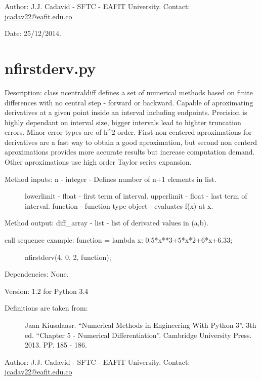 \documentclass[letterpaper,10pt,oneside]{sphinxmanual}
\theoremstyle{plain}%
\theoremstyle{definition}%
\theoremstyle{remark}%
\begin{document}
Author: J.J. Cadavid - SFTC - EAFIT University.
Contact: \href{mailto:jcadav22@eafit.edu.co}{jcadav22@eafit.edu.co}

Date: 25/12/2014.


\section{nfirstderv.py}
\label{code:module-nfirstderv}\label{code:nfirstderv-py}
Description: class ncentraldiff defines a set of numerical methods based on
finite differences with no central step - forward or backward. Capable of
aproximating derivatives at a given point inside an interval including 
endpoints. Precision is highly dependant on interval size, bigger intervals
lead to highter truncation errors. Minor error types are of h\textasciicircum{}2 order. First
non centered aproximations for derivatives are a fast way to obtain a good
aproximation, but second non centerd aproximations provides more accurate
results but increase computation demand. Other aproximations use high order
Taylor series expansion.
\begin{description}
\item[{Method inputs: n - integer - Defines number of n+1 elements in list.}] \leavevmode
lowerlimit - float - first term of interval.
upperlimit - float - last term of interval.
function - function type object - evaluates f(x) at x.

\end{description}

Method output: diff\_array - list - list of derivated values in (a,b).
\begin{description}
\item[{call sequence example: function = lambda x: 0.5*x**3+5*x*2+6*x+6.33;}] \leavevmode
nfirstderv(4, 0, 2, function);

\end{description}

Dependencies: None.

Version: 1.2 for Python 3.4
\begin{description}
\item[{Definitions are taken from:}] \leavevmode
Jaan Kiusalaasr. ``Numerical Methods in Engineering With Python 3''.
3th ed. ``Chapter 5 - Numerical Differentiation''. 
Cambridge University Press. 2013. PP. 185 - 186.

\end{description}

Author: J.J. Cadavid - SFTC - EAFIT University.
Contact: \href{mailto:jcadav22@eafit.edu.co}{jcadav22@eafit.edu.co}
\end{document}
